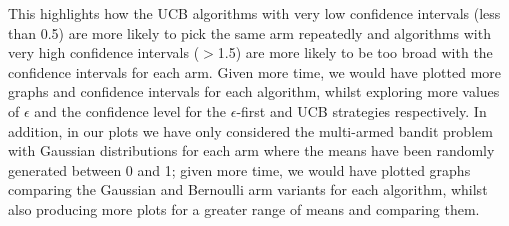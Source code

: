This highlights how the UCB algorithms with very low confidence intervals (less than 0.5) are more likely to pick the same arm repeatedly and algorithms with very high confidence intervals ($>$1.5) are more likely to be too broad with the confidence intervals for each arm.
\newline
Given more time, we would have plotted more graphs and confidence intervals for each algorithm, whilst exploring more values of $\epsilon$ and the confidence level for the $\epsilon$-first and UCB strategies respectively. 
In addition, in our plots we have only considered the multi-armed bandit problem with Gaussian distributions for each arm where the means have been randomly generated between 0 and 1;
given more time, we would have plotted graphs comparing the Gaussian and Bernoulli arm variants for each algorithm, whilst also producing more plots for a greater range of means and comparing them.